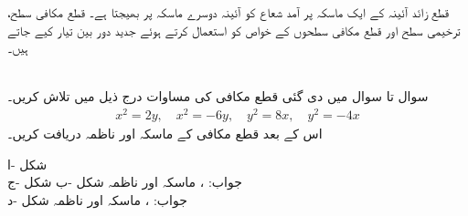 قطع زائد آئینہ کے ایک ماسکہ پر آمد شعاع کو آئینہ دوسرے ماسکہ پر بھیجتا ہے۔ قطع مکافی سطح، ترخیمی سطح اور قطع مکافی سطحوں کے خواص کو استعمال کرتے ہوئے جدید دور بین تیار کیے جاتے ہیں۔   

\\
سوال  تا سوال  میں دی  گئی قطع مکافی کی مساوات درج ذیل میں تلاش کریں۔
\begin{align*}
x^2=2y,\quad x^2=-6y,\quad y^2=8x,\quad y^2=-4x
\end{align*}
اس کے بعد قطع مکافی کے ماسکہ اور ناظمہ دریافت کریں۔

شکل -ا\\
جواب:\quad
{}، ماسکہ  اور ناظمہ 
شکل -ب
شکل -ج\\
جواب:\quad
{}، ماسکہ  اور ناظمہ 
شکل -د
